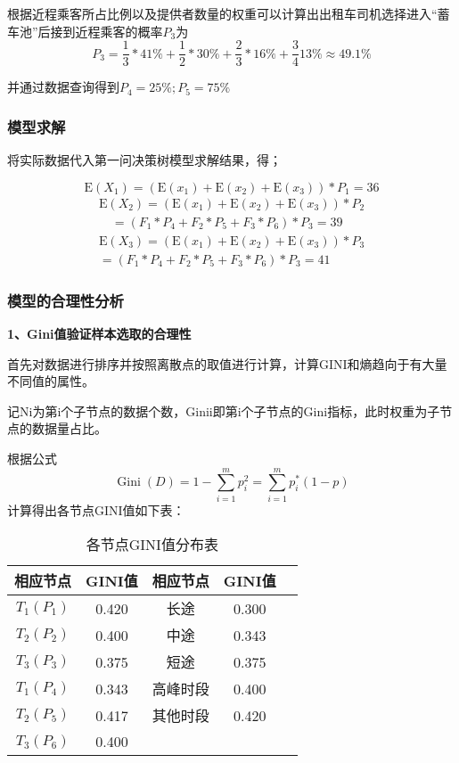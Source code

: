 \documentclass[withoutpreface,bwprint]{cumcmthesis} %
\begin{document}
根据近程乘客所占比例以及提供者数量的权重可以计算出出租车司机选择进入“蓄车池”后接到近程乘客的概率$P_3$为
$$
P_{3}=\frac{1}{3} * 41 \%+\frac{1}{2} * 30 \%+\frac{2}{3} * 16 \%+\frac{3}{4} 13 \% \approx 49.1 \%
$$

并通过数据查询得到$P_{4}=25 \% ; P_{5}=75 \%$

\subsubsection{模型求解}
将实际数据代入第一问决策树模型求解结果，得；

$$
\mathrm{E}\left(X_{1}\right)=\left(\mathrm{E}\left(x_{1}\right)+\mathrm{E}\left(x_{2}\right)+\mathrm{E}\left(x_{3}\right)\right) * P_{1}=36
$$
$$
\begin{array}{l}{\mathrm{E}\left(X_{2}\right)=\left(\mathrm{E}\left(x_{1}\right)+\mathrm{E}\left(x_{2}\right)+\mathrm{E}\left(x_{3}\right)\right) * P_{2}} \\ {\quad=\left(F_{1} * P_{4}+F_{2} * P_{5}+F_{3} * P_{6}\right) * P_{3}}=39\end{array}
$$
$$
\begin{array}{l}{\mathrm{E}\left(X_{3}\right)=\left(\mathrm{E}\left(x_{1}\right)+\mathrm{E}\left(x_{2}\right)+\mathrm{E}\left(x_{3}\right)\right) * P_{3}} \\ {=\left(F_{1} * P_{4}+F_{2} * P_{5}+F_{3} * P_{6}\right) * P_{3}}=41\end{array}
$$

\subsubsection{模型的合理性分析}
\textbf{1、Gini值验证样本选取的合理性}

首先对数据进行排序并按照离散点的取值进行计算，计算GINI和熵趋向于有大量不同值的属性。

记Ni为第i个子节点的数据个数，Ginii即第i个子节点的Gini指标，此时权重为子节点的数据量占比。

根据公式
$$
\operatorname{Gini}(D)=1-\sum_{i=1}^{m} p_{i}^{2}=\sum_{i=1}^{m} p_{i}^{*}(1-p)
$$
计算得出各节点GINI值如下表：
\begin{table}[!htbp]
	\caption{各节点GINI值分布表}\label{tab:006} \centering
	\begin{tabular}{ccccc}
		\toprule[2pt]
		相应节点 & GINI值 & 相应节点 & GINI值\\
		\midrule[1pt]
		$T_{1}\left(P_{1}\right)$ & 0.420 & 长途 & 0.300\\
     	$T_{2}\left(P_{2}\right)$ & 0.400 & 中途 & 0.343\\
		$T_{3}\left(P_{3}\right)$ & 0.375 & 短途 & 0.375\\
		$T_{1}\left(P_{4}\right)$ & 0.343 & 高峰时段 & 0.400\\
		$T_{2}\left(P_{5}\right)$ & 0.417 & 其他时段 &0.420\\
		$T_{3}\left(P_{6}\right)$ & 0.400\\
		\bottomrule[1.5pt]
	\end{tabular}
\end{table}
\end{document}
